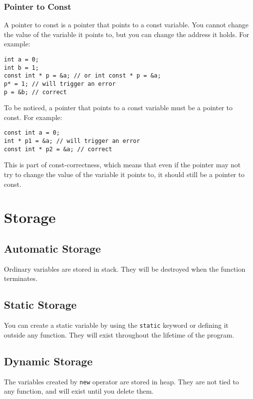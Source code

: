 \documentclass[a4paper,12pt]{article}
\begin{document}
\subsubsection{Pointer to Const}

A pointer to const is a pointer that points to a const variable.
You cannot change the value of the variable it points to, but you can change the address it holds.
For example:
\begin{verbatim}
int a = 0;
int b = 1;
const int * p = &a; // or int const * p = &a;
p* = 1; // will trigger an error
p = &b; // correct
\end{verbatim}

To be noticed, a pointer that points to a const variable must be a pointer to const.
For example:
\begin{verbatim}
const int a = 0;
int * p1 = &a; // will trigger an error
const int * p2 = &a; // correct
\end{verbatim}

This is part of const-correctness, which means that even if the pointer may not try to change the value of the variable it points to, it should still be a pointer to const.
\section{Storage}

\subsection{Automatic Storage}

Ordinary variables are stored in stack.
They will be destroyed when the function terminates.

\subsection{Static Storage}

You can create a static variable by using the \texttt{static} keyword or defining it outside any function.
They will exist throughout the lifetime of the program.

\subsection{Dynamic Storage}

The variables created by \texttt{new} operator are stored in heap.
They are not tied to any function, and will exist until you delete them.
\end{document}
